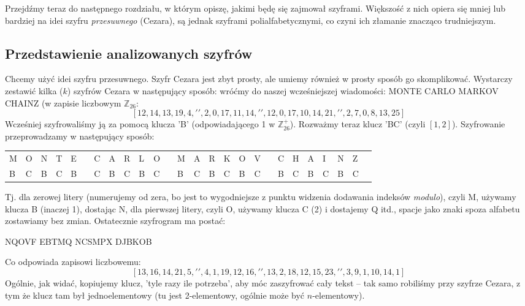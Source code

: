 \documentclass[a4paper]{article}
\theoremstyle{defn}
\theoremstyle{theorem}
\theoremstyle{lemma}
\theoremstyle{cor}
\theoremstyle{fact}
\begin{document}
Przejdźmy teraz do następnego rozdziału, w którym opiszę, jakimi będę się zajmował szyframi. Większość z nich opiera się mniej lub bardziej na idei szyfru \textit{przesuwnego} (Cezara), są jednak szyframi polialfabetycznymi, co czyni ich złamanie znacząco trudniejszym.\\

\subsection{Przedstawienie analizowanych szyfrów}
Chcemy użyć idei szyfru przesuwnego. Szyfr Cezara jest zbyt prosty, ale umiemy również w prosty sposób go skomplikować. Wystarczy zestawić kilka ($k$) szyfrów Cezara w następujący sposób:
wróćmy do naszej wcześniejszej wiadomości: MONTE CARLO MARKOV CHAINZ (w zapisie liczbowym $\mathbb{Z}_{26}$:
$$[12, 14, 13, 19, 4, ' ', 2, 0, 17, 11, 14, ' ', 12, 0, 17, 10, 14, 21, ' ', 2, 7, 0, 8, 13, 25]$$
Wcześniej szyfrowaliśmy ją za pomocą klucza 'B' (odpowiadającego 1 w $\mathbb{Z}_{26}^+$). Rozważmy teraz klucz 'BC' (czyli $[1, 2]$). Szyfrowanie przeprowadzamy w następujący sposób:
\begin{center}\begin{tabular}{|p{1.5mm}|p{1.5mm}|p{1.5mm}|p{1.5mm}|p{1.5mm}|p{1.5mm}|p{1.5mm}|p{1.5mm}|p{1.5mm}|p{1.5mm}|p{1.5mm}|p{1.5mm}|p{1.5mm}|p{1.5mm}|p{1.5mm}|p{1.5mm}|p{1.5mm}|p{1.5mm}|p{1.5mm}|p{1.5mm}|p{1.5mm}|p{1.5mm}|p{1.5mm}|p{1.5mm}|p{1.5mm}|p{1.5mm}|}
    M & O & N & T & E & & C & A & R & L & O & & M & A & R & K & O & V & & C & H & A & I & N & Z \\
    B & C & B & C & B & & C & B & C & B & C & & B & C & B & C & B & C & & B & C & B & C & B & C
\end{tabular}
\end{center}
Tj. dla zerowej litery (numerujemy od zera, bo jest to wygodniejsze z punktu widzenia dodawania indeksów \textit{modulo}), czyli M, używamy klucza B (inaczej 1), dostając N, dla pierwszej litery, czyli O, używamy klucza C (2) i dostajemy Q itd., spacje jako znaki spoza alfabetu zostawiamy bez zmian. Ostatecznie szyfrogram ma postać:
\begin{center}
    NQOVF EBTMQ NCSMPX DJBKOB
\end{center}
Co odpowiada zapisowi liczbowemu:
$$ [13, 16, 14, 21, 5, ' ', 4, 1, 19, 12, 16, ' ', 13, 2, 18, 12, 15, 23, ' ', 3, 9, 1, 10, 14, 1]$$
Ogólnie, jak widać, kopiujemy klucz, 'tyle razy ile potrzeba', aby móc zaszyfrować cały tekst – tak samo robiliśmy przy szyfrze Cezara, z tym że klucz tam był jednoelementowy (tu jest 2-elementowy, ogólnie może być $n$-elementowy).\\\\
\end{document}
